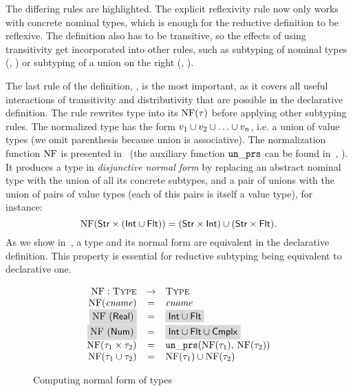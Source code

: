 The differing rules are \colorbox{light-gray}{highlighted}.
The explicit reflexivity rule  now only works with 
concrete nominal types, which is enough 
for the reductive definition to be reflexive.
The definition also has to be transitive,
so the effects of using transitivity get incorporated into
other rules, such as subtyping of nominal types (, )
or subtyping of a union on the right (, ).

The last rule of the definition, , is the most important,
as it covers all useful interactions of transitivity and distributivity 
that are possible in the declarative definition.
The rule rewrites type \ty into its  $\mathop{\mathrm{NF}}(\tau)$
before applying other subtyping rules.
The normalized type has the form $v_1 \cup v_2 \cup \ldots \cup v_n$,
i.e. a union of value types
(we omit parenthesis because union is associative).
The normalization function $\mathop{\mathrm{NF}}$ is presented in~
(the auxiliary function $\mathop{\mathtt{un\_prs}}$ 
can be found in~, ).
It produces a type in \emph{disjunctive normal form}
by replacing an abstract nominal type 
with the union of all its concrete subtypes, 
and a pair of unions with the union of pairs of value types
(each of this pairs is itself a value type),
for instance:
\[
\mathop{\mathrm{NF}}(\mathsf{Str} \times (\mathsf{Int} \cup \mathsf{Flt})) =
(\mathsf{Str} \times \mathsf{Int}) \cup (\mathsf{Str} \times \mathsf{Flt}).
\]
As we show in~, a type and its normal form are
equivalent in the declarative definition.
This property is essential for reductive subtyping 
being equivalent to declarative one.

\begin{figure}
  \[
	\begin{array}{rcl}
	\NF: \Type &\rightarrow& \Type \\
	\NF(\cname) &=& \cname \\
	\colorbox{light-gray}{\NF(\tyreal)} &=&
	\colorbox{light-gray}{\tyunion{\tyint}{\tyflt}} \\
	\colorbox{light-gray}{\NF(\tynum)} &=&
	\colorbox{light-gray}{\tyunion{\tyunion{\tyint}{\tyflt}}{\tycmplx}} \\
	\NF(\typair{\ty_1}{\ty_2}) &=& \unprs(\NF(\ty_1), \, \NF(\ty_2))	\\
	\NF(\tyunion{\ty_1}{\ty_2}) &=& \tyunion{\NF(\ty_1)}{\NF(\ty_2)} \\
	\end{array}
  \]
	\caption{Computing normal form of \BetaJulia types}
	\label{fig:bjsem-calc-nf}
\end{figure}

